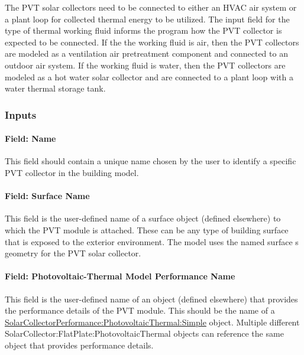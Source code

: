 The PVT solar collectors need to be connected to either an HVAC air system or a plant loop for collected thermal energy to be utilized. The input field for the type of thermal working fluid informs the program how the PVT collector is expected to be connected. If the the working fluid is air, then the PVT collectors are modeled as a ventilation air pretreatment component and connected to an outdoor air system. If the working fluid is water, then the PVT collectors are modeled as a hot water solar collector and are connected to a plant loop with a water thermal storage tank.

\subsubsection{Inputs}\label{inputs-4-032}

\paragraph{Field: Name}\label{field-name-4-027}

This field should contain a unique name chosen by the user to identify a specific PVT collector in the building model.

\paragraph{Field: Surface Name}\label{field-surface-name-2-001}

This field is the user-defined name of a surface object (defined elsewhere) to which the PVT module is attached. These can be any type of building surface that is exposed to the exterior environment. The model uses the named surface s geometry for the PVT solar collector.

\paragraph{Field: Photovoltaic-Thermal Model Performance Name}\label{field-photovoltaic-thermal-model-performance-name}

This field is the user-defined name of an object (defined elsewhere) that provides the performance details of the PVT module. This should be the name of a \hyperref[solarcollectorperformancephotovoltaicthermalsimple]{SolarCollectorPerformance:PhotovoltaicThermal:Simple} object. Multiple different SolarCollector:FlatPlate:PhotovoltaicThermal objects can reference the same object that provides performance details.

